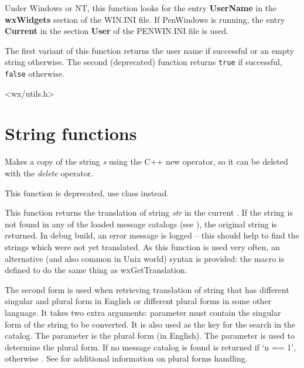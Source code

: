 Under Windows or NT, this function looks for the entry {\bf UserName}\rtfsp
in the {\bf wxWidgets} section of the WIN.INI file. If PenWindows
is running, the entry {\bf Current} in the section {\bf User} of
the PENWIN.INI file is used.

The first variant of this function returns the user name if successful or an
empty string otherwise. The second (deprecated) function returns {\tt true}
if successful, {\tt false} otherwise.




<wx/utils.h>



\section{String functions}


\label{copystring}


Makes a copy of the string {\it s} using the C++ new operator, so it can be
deleted with the {\it delete} operator.

This function is deprecated, use  class instead.


\label{wxgettranslation}



This function returns the translation of string {\it str} in the current
. If the string is not found in any of the loaded
message catalogs (see ), the
original string is returned. In debug build, an error message is logged -- this
should help to find the strings which were not yet translated. As this function
is used very often, an alternative (and also common in Unix world) syntax is
provided: the  macro is defined to do the same thing
as wxGetTranslation.

The second form is used when retrieving translation of string that has
different singular and plural form in English or different plural forms in some
other language. It takes two extra arguments: 
parameter must contain the singular form of the string to be converted.
It is also used as the key for the search in the catalog.
The  parameter is the plural form (in English).
The parameter  is used to determine the plural form.  If no
message catalog is found  is returned if `n == 1',
otherwise .
See  for additional information on plural forms handling.

